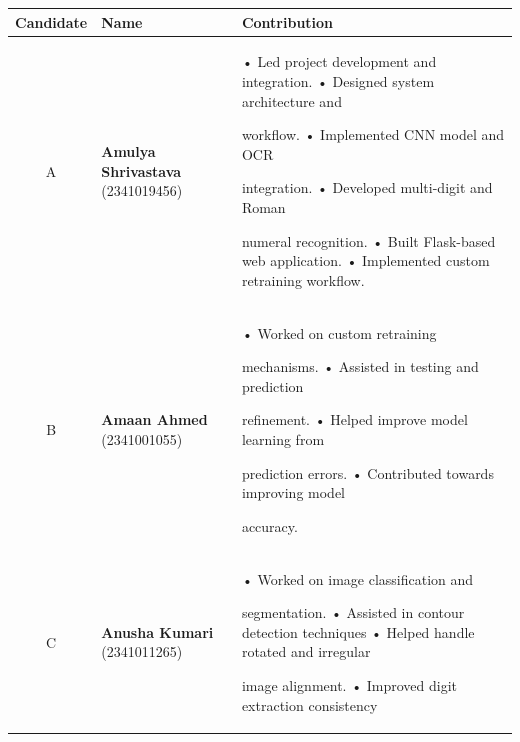\documentclass[12pt,a4paper]{article}
\begin{document}
\vspace{0.5cm}
\hspace*{-0.5cm}
\begin{tabular}{|c|p{4.5cm}|>{\raggedright\arraybackslash}p{7.8cm}|}
\hline

\textbf{Candidate} & \textbf{Name} & \textbf{Contribution} \\
\hline

A &
\textbf{Amulya Shrivastava} \newline
(2341019456)
&
• Led project development and integration. \newline
• Designed system architecture and
\par \hspace*{0.5cm}workflow. \newline
• Implemented CNN model and OCR \par \hspace*{0.5cm}integration. \newline
• Developed multi-digit and Roman \par \hspace*{0.5cm}numeral recognition. \newline
• Built Flask-based web application. \newline
• Implemented custom retraining workflow.
\\
\hline

B &
\textbf{Amaan Ahmed} \newline
(2341001055)
&
• Worked on custom retraining \par \hspace*{0.5cm}mechanisms. \newline
• Assisted in testing and prediction \par \hspace*{0.5cm}refinement. \newline
• Helped improve model learning from \par \hspace*{0.5cm}prediction errors. \newline
• Contributed towards improving model \par \hspace*{0.5cm}accuracy.
\\
\hline

C &
\textbf{Anusha Kumari} \newline
(2341011265)
&
• Worked on image classification and \par \hspace*{0.5cm}segmentation. \newline
• Assisted in contour detection techniques \newline
• Helped handle rotated and irregular \par \hspace*{0.5cm}image alignment. \newline
• Improved digit extraction consistency
\\
\hline


\end{tabular}
\end{document}
